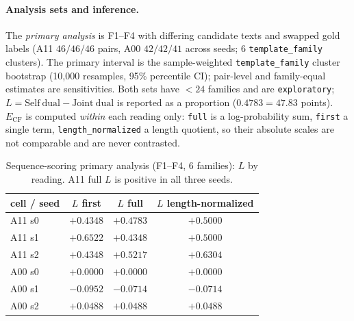 \documentclass[11pt,a4paper]{article}
\begin{document}
\paragraph{Analysis sets and inference.} The \emph{primary analysis} is F1--F4
with differing candidate texts and swapped gold labels (A11 $46/46/46$ pairs,
A00 $42/42/41$ across seeds; 6 \texttt{template\_family} clusters). The
primary interval is the sample-weighted \texttt{template\_family} cluster
bootstrap (10{,}000 resamples, 95\% percentile CI); pair-level and family-equal
estimates are sensitivities. Both sets have $<24$ families and are
\texttt{exploratory}; $L=\mathrm{Self\ dual}-\mathrm{Joint\ dual}$ is reported
as a proportion ($0.4783=47.83$ points). $E_{\mathrm{CF}}$ is computed
\emph{within} each reading only: \texttt{full} is a log-probability sum,
\texttt{first} a single term, \texttt{length\_normalized} a length quotient, so
their absolute scales are not comparable and are never contrasted.

\begin{table}[t]
\centering
\caption{Sequence-scoring primary analysis (F1--F4, 6 families): $L$ by reading.
A11 full $L$ is positive in all three seeds.}
\label{tab:seqL}
\begin{tabular}{lccc}
\toprule
cell / seed & $L$ first & $L$ full & $L$ length-normalized \\
\midrule
A11 s0 & $+0.4348$ & $+0.4783$ & $+0.5000$ \\
A11 s1 & $+0.6522$ & $+0.4348$ & $+0.5000$ \\
A11 s2 & $+0.4348$ & $+0.5217$ & $+0.6304$ \\
A00 s0 & $+0.0000$ & $+0.0000$ & $+0.0000$ \\
A00 s1 & $-0.0952$ & $-0.0714$ & $-0.0714$ \\
A00 s2 & $+0.0488$ & $+0.0488$ & $+0.0488$ \\
\bottomrule
\end{tabular}
\end{table}
\end{document}
